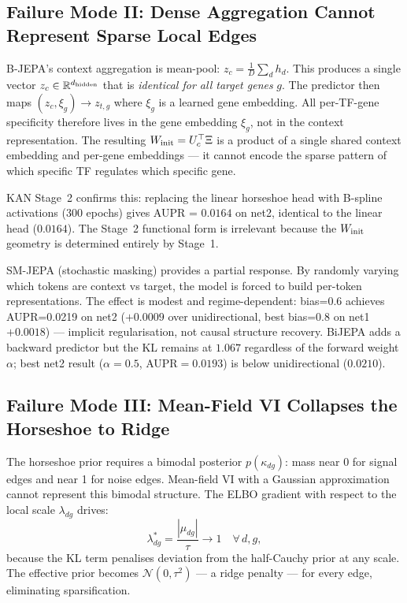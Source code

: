 \documentclass[11pt]{article}
\begin{document}
\subsection{Failure Mode II: Dense Aggregation Cannot Represent Sparse Local Edges}

B-JEPA's context aggregation is mean-pool: $z_c = \frac{1}{D}\sum_d h_d$.
This produces a single vector $z_c \in \mathbb{R}^{d_{\rm hidden}}$ that is
\emph{identical for all target genes} $g$.
The predictor then maps $(z_c, \xi_g) \to z_{t,g}$ where $\xi_g$ is a learned
gene embedding.
All per-TF-gene specificity therefore lives in the gene embedding $\xi_g$,
not in the context representation.
The resulting $W_{\rm init} = U_c^\top \Xi$ is a product of a single shared
context embedding and per-gene embeddings --- it cannot encode the sparse
pattern of which specific TF regulates which specific gene.

KAN Stage~2 confirms this: replacing the linear horseshoe head with B-spline
activations (300 epochs) gives AUPR = $0.0164$ on net2, identical to the
linear head ($0.0164$).
The Stage~2 functional form is irrelevant because the $W_{\rm init}$ geometry
is determined entirely by Stage~1.

SM-JEPA (stochastic masking) provides a partial response.
By randomly varying which tokens are context vs target, the model is forced to
build per-token representations.
The effect is modest and regime-dependent: bias=0.6 achieves AUPR=0.0219 on
net2 ($+0.0009$ over unidirectional, best bias=0.8 on net1 $+0.0018$) ---
implicit regularisation, not causal structure recovery.
BiJEPA adds a backward predictor but the KL remains at $1.067$ regardless of
the forward weight $\alpha$; best net2 result ($\alpha=0.5$, AUPR$=0.0193$)
is below unidirectional ($0.0210$).

\subsection{Failure Mode III: Mean-Field VI Collapses the Horseshoe to Ridge}

The horseshoe prior requires a bimodal posterior $p(\kappa_{dg})$: mass near 0
for signal edges and near 1 for noise edges.
Mean-field VI with a Gaussian approximation cannot represent this bimodal
structure.
The ELBO gradient with respect to the local scale $\lambda_{dg}$ drives:
\begin{equation}
  \lambda_{dg}^* = \frac{|\mu_{dg}|}{\tau} \longrightarrow 1 \quad \forall\, d,g,
\end{equation}
because the KL term penalises deviation from the half-Cauchy prior at any
scale.
The effective prior becomes $\mathcal{N}(0, \tau^2)$ --- a ridge penalty ---
for every edge, eliminating sparsification.
\end{document}
